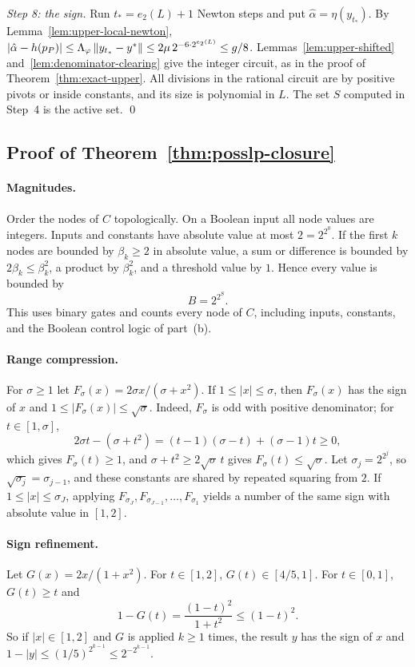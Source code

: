 \emph{Step 8: the sign.} Run $t_*=e_2(L)+1$ Newton steps and put
$\hat\alpha=\eta(y_{t_*})$. By Lemma~\ref{lem:upper-local-newton},
$|\hat\alpha-h(p_P)|\le\Lambda_\varphi\left\lVert y_{t_*}-y^*\right\rVert\le2\mu\,2^{-6\cdot
2^{e_2(L)}}\le g/8$. Lemmas~\ref{lem:upper-shifted}
and~\ref{lem:denominator-clearing} give the integer circuit, as in the proof of
Theorem~\ref{thm:exact-upper}. All divisions in the rational circuit are by
positive pivots or inside constants, and its size is polynomial in $L$. The
set $S$ computed in Step~4 is the active set. \qed

\subsection{Proof of Theorem~\ref{thm:posslp-closure}}
\label{app:upper-closure}

\paragraph{Magnitudes.}
Order the nodes of $C$ topologically. On a Boolean input all node values are
integers. Inputs and constants have absolute value at most $2=2^{2^0}$. If
the first $k$ nodes are bounded by $\beta_k\ge2$ in absolute value, a sum or
difference is bounded by $2\beta_k\le\beta_k^2$, a product by $\beta_k^2$, and
a threshold value by $1$. Hence every value is bounded by
\[
 B=2^{2^S}.
\]
This uses binary gates and counts every node of $C$, including inputs,
constants, and the Boolean control logic of part~(b).

\paragraph{Range compression.}
For $\sigma\ge1$ let $F_\sigma(x)=2\sigma x/(\sigma+x^2)$. If
$1\le|x|\le\sigma$, then $F_\sigma(x)$ has the sign of $x$ and
$1\le|F_\sigma(x)|\le\sqrt\sigma$. Indeed, $F_\sigma$ is odd with positive
denominator; for $t\in[1,\sigma]$,
\[
 2\sigma t-(\sigma+t^2)=(t-1)(\sigma-t)+(\sigma-1)t\ge0,
\]
which gives $F_\sigma(t)\ge1$, and $\sigma+t^2\ge2\sqrt\sigma\,t$ gives
$F_\sigma(t)\le\sqrt\sigma$. Let $\sigma_j=2^{2^j}$, so
$\sqrt{\sigma_j}=\sigma_{j-1}$, and these constants are shared by repeated
squaring from $2$. If $1\le|x|\le\sigma_J$, applying
$F_{\sigma_J},F_{\sigma_{J-1}},\ldots,F_{\sigma_1}$ yields a number of the same
sign with absolute value in $[1,2]$.

\paragraph{Sign refinement.}
Let $G(x)=2x/(1+x^2)$. For $t\in[1,2]$, $G(t)\in[4/5,1]$. For $t\in[0,1]$,
$G(t)\ge t$ and
\[
 1-G(t)=\frac{(1-t)^2}{1+t^2}\le(1-t)^2 .
\]
So if $|x|\in[1,2]$ and $G$ is applied $k\ge1$ times, the result $y$ has
the sign of $x$ and $1-|y|\le(1/5)^{2^{k-1}}\le2^{-2^{k-1}}$.

